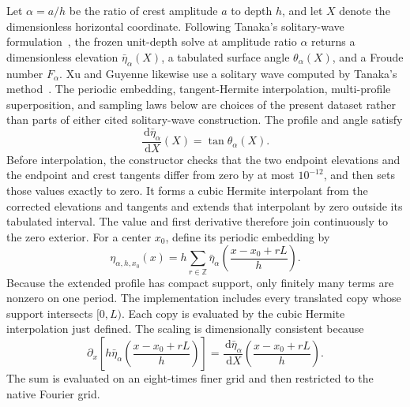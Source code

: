 \documentclass[11pt]{article}
\newcommand{\dd}{\,\mathrm d}
\begin{document}
Let $\alpha=a/h$ be the ratio of crest amplitude \(a\) to depth \(h\), and
let $X$ denote the dimensionless horizontal coordinate.  Following Tanaka's
solitary-wave formulation~\cite{tanaka1986}, the frozen unit-depth solve at
amplitude ratio \(\alpha\) returns a dimensionless elevation
$\bar\eta_\alpha(X)$, a tabulated surface angle
$\theta_\alpha(X)$, and a Froude number $F_\alpha$.  Xu and Guyenne likewise
use a solitary wave computed by Tanaka's method~\cite{xu2009}.  The periodic
embedding, tangent-Hermite interpolation, multi-profile superposition, and
sampling laws below are choices of the present dataset rather than parts of
either cited solitary-wave construction.  The profile and angle satisfy
\begin{equation}
  \frac{\dd\bar\eta_\alpha}{\dd X}(X)=\tan\theta_\alpha(X).
  \label{eq:tanaka-dimensionless-slope}
\end{equation}
Before interpolation, the constructor checks that the two endpoint
elevations and the endpoint and crest tangents differ from zero by at most
$10^{-12}$, and then sets those values exactly to zero.  It forms a cubic
Hermite interpolant from the corrected elevations and tangents and extends
that interpolant by zero outside its tabulated interval.  The value and first
derivative therefore join continuously to the zero exterior.  For a center
$x_0$, define its periodic embedding by
\begin{equation}
  \eta_{\alpha,h,x_0}(x)
  =h\sum_{r\in\mathbb Z}
    \bar\eta_\alpha\!\left(\frac{x-x_0+rL}{h}\right).
  \label{eq:tanaka-periodic-embedding}
\end{equation}
Because the extended profile has compact support, only finitely many terms
are nonzero on one period.  The implementation includes every translated
copy whose support intersects $[0,L)$.  Each copy is evaluated by the cubic
Hermite interpolation just defined.  The scaling is
dimensionally consistent because
\begin{equation}
  \partial_x\!\left[
    h\bar\eta_\alpha\!\left(\frac{x-x_0+rL}{h}\right)
  \right]
  =
  \frac{\dd\bar\eta_\alpha}{\dd X}
  \!\left(\frac{x-x_0+rL}{h}\right).
\end{equation}
The sum is evaluated on an eight-times finer grid and then restricted to the
native Fourier grid.
\end{document}
